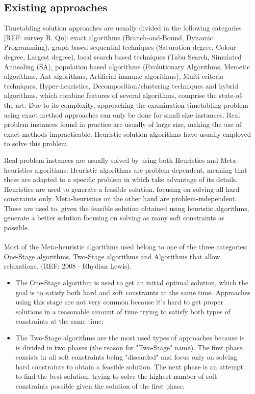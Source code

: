 \subsection{Existing approaches}
\label{subsection:ExistingAppr}

Timetabling solution approaches are usually divided in the following categories [REF: survey R. Qu]: exact algorithms (Branch-and-Bound, Dynamic Programming), graph based sequential techniques (Saturation degree, Colour degree, Largest degree), local search based techniques (Tabu Search, Simulated Annealing (SA), population based algorithms (Evolutionary Algorithms, Memetic algorithms, Ant algorithms, Artificial immune algorithms), Multi-criteria techniques, Hyper-heuristics, Decomposition/clustering techniques and hybrid algorithms, which combine features of several algorithms, comprise the state-of-the-art. Due to its complexity, approaching the examination timetabling problem using exact method approaches can only be done for small size instances. Real problem instances found in practice are usually of large size, making the use of exact methods impracticable. Heuristic solution algorithms have usually employed to solve this problem.

Real problem instances are usually solved by using both Heuristics and Meta-heuristics algorithms. Heuristic algorithms are problem-dependent, meaning that these are adapted to a specific problem in which take advantage of its details. Heuristics are used to generate a feasible solution, focusing on solving all hard constraints only. Meta-heuristics on the other hand are problem-independent. These are used to, given the feasible solution obtained using heuristic algorithms, generate a better solution focusing on solving as many soft constraints as possible.\\
\\
Most of the Meta-heuristic algorithms used belong to one of the three categories: One-Stage algorithms, Two-Stage algorithms and Algorithms that allow relaxations. (REF: 2008 - Rhydian Lewis). 
\begin{itemize}
  \item The One-Stage algorithm is used to get an initial optimal solution, which the goal is to satisfy both hard and soft constraints at the same time. Approaches using this stage are not very common because it's hard to get proper solutions in a reasonable amount of time trying to satisfy both types of constraints at the same time;
  \item The Two-Stage algorithms are the most used types of approaches because is is divided in two phases (the reason for "Two-Stage" name). The first phase consists in all soft constraints being "discarded" and focus only on solving hard constraints to obtain a feasible solution. The next phase is an attempt to find the best solution, trying to solve the highest number of soft constraints possible given the solution of the first phase.
\end{itemize}

